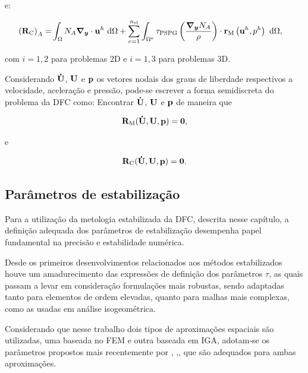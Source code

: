 \documentclass[tese_patricia]{subfiles}%
\begin{document}
\noindent e:

\begin{align}
	\begin{split}
	\left(\mathbf{R}_\mathrm{C}\right)_{A} = &\int_{\Omega} N_{A} \boldsymbol{\nabla_y} \cdot \mathbf{u}^h \ \mathrm{d} \Omega  
	+ \sum_{e=1}^{n_{\mathrm{el}}} \int_{\Omega^e} \tau_{\mathrm{PSPG}} \left(\frac{\boldsymbol{\nabla_y} N_{A}}{\rho}\right) \cdot \mathbf{r}_{\mathrm{M}}\left(\mathbf{u}^h,p^h\right) \  \mathrm{d} \Omega,
	\end{split}
\end{align}

\noindent com $i=1,2$ para problemas 2D e $i=1,3$ para problemas 3D.
		
Considerando $\mathbf{\dot{U}}$, $\mathbf{U}$ e $\mathbf{p}$ os vetores nodais dos graus de liberdade respectivos a velocidade, aceleração e pressão, pode-se escrever a forma semidiscreta do problema da DFC como: Encontrar $\mathbf{\dot{U}}$, $\mathbf{U}$ e $\mathbf{p}$ de maneira que

\begin{align}
\mathbf{R}_\mathrm{M}(\mathbf{\dot{U}},\mathbf{U},\mathbf{p}) = \mathbf{0},\label{eq:resid_semi_discr_QM}
\end{align}

\noindent e

\begin{align}
\mathbf{R}_\mathrm{C}(\mathbf{\dot{U}},\mathbf{U},\mathbf{p}) = \mathbf{0}. \label{eq:resid_semi_discr_C}
\end{align}



\subsection{Parâmetros de estabilização}\label{capitulo:Cap2:FormaFraca:taus}

Para a utilização da metologia estabilizada da DFC, descrita nesse capítulo, a definição adequada dos parâmetros de estabilização desempenha papel fundamental na precisão e estabilidade numérica.

Desde os primeiros desenvolvimentos relacionados aos métodos estabilizados houve um amadurecimento das expressões de definição dos parâmetros $\tau$, as quais passam a levar em consideração formulações mais robustas, sendo adaptadas tanto para elementos de ordem elevadas, quanto para malhas mais complexas, como as usadas em análise isogeométrica.

Considerando que nesse trabalho dois tipos de aproximações espaciais são utilizadas, uma baseada no FEM e outra baseada em IGA, adotam-se os parâmetros propostos mais recentemente por , ,, que são adequados para ambas aproximações. 
\end{document}
